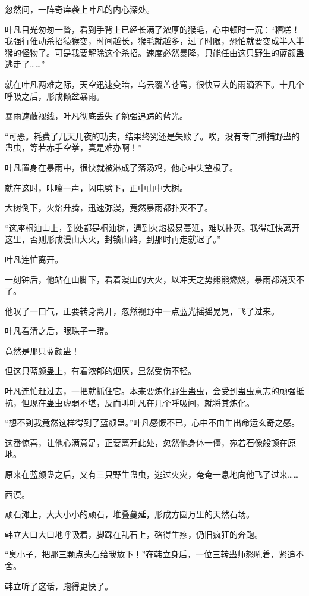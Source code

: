 \begin{this_body}
忽然间，一阵奇痒袭上叶凡的内心深处。

叶凡目光匆匆一瞥，看到手背上已经长满了浓厚的猴毛，心中顿时一沉：“糟糕！我强行催动杀招猿猴变，时间越长，猴毛就越多，过了时限，恐怕就要变成半人半猴的怪物了。可是我要解除这个杀招。速度必然暴降，只能任由这只野生的蓝颜蛊逃走了……”

就在叶凡两难之际，天空迅速变暗，乌云覆盖苍穹，很快豆大的雨滴落下。十几个呼吸之后，形成倾盆暴雨。

暴雨遮蔽视线，叶凡彻底丢失了勉强追踪的蓝光。

“可恶。耗费了几天几夜的功夫，结果终究还是失败了。唉，没有专门抓捕野蛊的蛊虫，等若赤手空拳，真是难办啊！”

叶凡置身在暴雨中，很快就被淋成了落汤鸡，他心中失望极了。

就在这时，咔嚓一声，闪电劈下，正中山中大树。

大树倒下，火焰升腾，迅速弥漫，竟然暴雨都扑灭不了。

“这座桐油山上，到处都是桐油树，遇到火焰极易蔓延，难以扑灭。我得赶快离开这里，否则形成漫山大火，封锁山路，到那时再走就迟了。”

叶凡连忙离开。

一刻钟后，他站在山脚下，看着漫山的大火，以冲天之势熊熊燃烧，暴雨都浇灭不了。

他叹了一口气，正要转身离开，忽然视野中一点蓝光摇摇晃晃，飞了过来。

叶凡看清之后，眼珠子一瞪。

竟然是那只蓝颜蛊！

但这只蓝颜蛊上，有着浓郁的烟灰，显然受伤不轻。

叶凡连忙赶过去，一把就抓住它。本来要炼化野生蛊虫，会受到蛊虫意志的顽强抵抗，但现在蛊虫虚弱不堪，反而叫叶凡在几个呼吸间，就将其炼化。

“想不到我竟然这样得到了蓝颜蛊。”叶凡感慨不已，心中不由生出命运玄奇之感。

这番惊喜，让他心满意足，正要离开此处，忽然他身体一僵，宛若石像般顿在原地。

原来在蓝颜蛊之后，又有三只野生蛊虫，逃过火灾，奄奄一息地向他飞了过来……

西漠。

顽石滩上，大大小小的顽石，堆叠蔓延，形成方圆万里的天然石场。

韩立大口大口地呼吸着，脚踩在乱石上，硌得生疼，仍旧疯狂的奔跑。

“臭小子，把那三颗点头石给我放下！”在韩立身后，一位三转蛊师怒吼着，紧追不舍。

韩立听了这话，跑得更快了。


\end{this_body}
